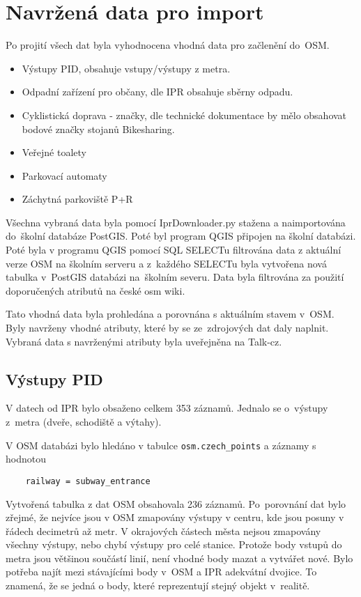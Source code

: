 \section{Navržená data pro import}
\label{Navržená data pro import}

Po projití všech dat byla vyhodnocena vhodná data pro začlenění
do~OSM.

\begin{itemize}
    \item   Výstupy PID, obsahuje vstupy/výstupy z metra.
    \item   Odpadní zařízení pro občany, dle IPR obsahuje sběrny
                odpadu. 
    \item   Cyklistická doprava - značky, dle technické dokumentace by
                mělo 
            obsahovat bodové značky stojanů Bikesharing.
    \item   Veřejné toalety
    \item   Parkovací automaty
    \item   Záchytná parkoviště P+R
\end{itemize}

Všechna vybraná data byla pomocí IprDownloader.py stažena a
naimportována do~školní databáze PostGIS. Poté byl program QGIS
připojen na školní databázi. Poté byla v programu QGIS pomocí SQL
SELECTu filtrována data z aktuální verze OSM na školním serveru a
z~každého SELECTu byla vytvořena nová tabulka v~PostGIS databázi
na~školním severu. Data byla filtrována za použití doporučených
atributů na české osm wiki. \cite{OSMfeatures}

Tato vhodná data byla prohledána a porovnána s aktuálním stavem v~OSM.
Byly navrženy vhodné atributy, které by se ze~zdrojových dat daly
naplnit. Vybraná data s navrženými atributy byla uveřejněna na Talk-cz.


\subsection{Výstupy PID}
\label{Výstupy PID}
V datech od IPR bylo obsaženo celkem 353 záznamů. Jednalo se
o~výstupy z~metra (dveře, schodiště a výtahy).

V OSM databázi bylo hledáno v tabulce {\tt osm.czech\_points}
a záznamy s hodnotou
\begin{verbatim}
    railway = subway_entrance
\end{verbatim}
Vytvořená tabulka z dat OSM obsahovala 236 záznamů. Po~porovnání dat
bylo zřejmé, že nejvíce jsou v OSM zmapovány výstupy v centru, kde
jsou posuny v řádech decimetrů až metr. V okrajových částech města
nejsou zmapovány všechny výstupy, nebo chybí výstupy pro celé stanice.
Protože body vstupů do metra jsou většinou součástí linií, není vhodné
body mazat a vytvářet nové. Bylo potřeba najít mezi stávajícími body
v~OSM a IPR adekvátní dvojice. To znamená, že se jedná o body, které
reprezentují stejný objekt v~realitě.

